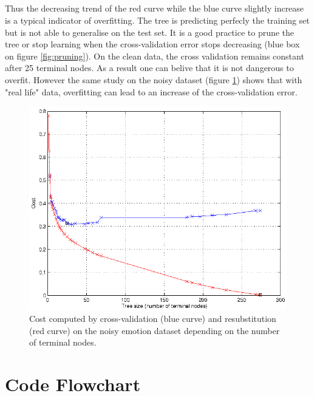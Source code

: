 \documentclass[a4paper,12pt,oneside,final]{report}
\begin{document}
\paragraph{}
Thus the decreasing trend of the red curve while the blue curve slightly increase is a typical indicator of overfitting. The tree is predicting perfecly the training set but is not able to generalise on the test set. It is a good practice to prune the tree or stop learning when the cross-validation error stops decreasing (blue box on figure \ref{fig:pruning}). On the clean data, the cross validation remains constant after 25 terminal nodes. As a result one can belive that it is not dangerous to overfit. However the same study on the noisy dataset (figure \ref{fig:pruning_noisy}) shows that with "real life" data, overfitting can lead to an increase of the cross-validation error.
\begin{figure}[!h]
\center
\includegraphics{pruning_example_noisy.png}
\caption[Pruning example on clean data.]{Cost computed by cross-validation (blue curve) and resubstitution (red curve) on the noisy emotion dataset depending on the number of terminal nodes. \label{fig:pruning_noisy}}
\end{figure}
\chapter{Code Flowchart}
\end{document}
